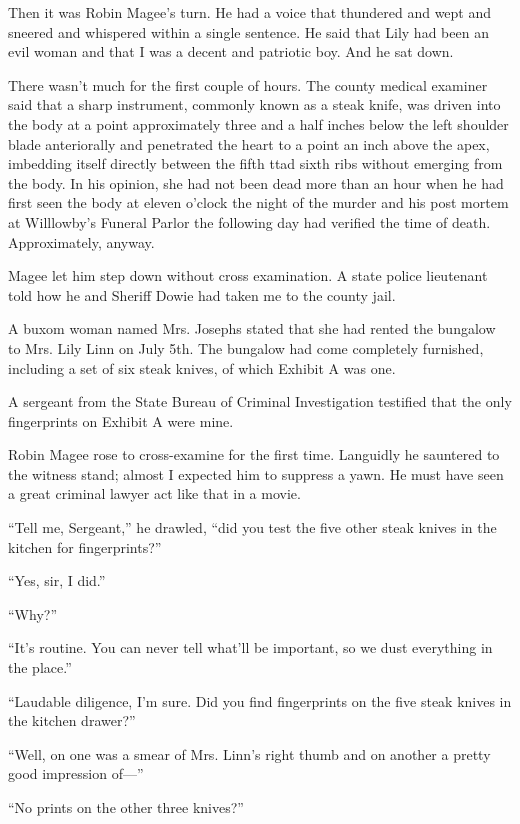 \documentclass{novel}
\begin{document}
Then it was Robin Magee’s turn. He had a voice that thundered and wept and sneered and whispered within a single sentence. He said that Lily had been an evil woman and that I was a decent and patriotic boy. And he sat down.

There wasn’t much for the first couple of hours. The county medical examiner said that a sharp instrument, commonly known as a steak knife, was driven into the body at a point approximately three and a half inches below the left shoulder blade anteriorally and penetrated the heart to a point an inch above the apex, imbedding itself directly between the fifth ttad sixth ribs without emerging from the body. In his opinion, she had not been dead more than an hour when he had first seen the body at eleven o’clock the night of the murder and his post mortem at Willlowby’s Funeral Parlor the following day had verified the time of death. Approximately, anyway.

Magee let him step down without cross examination. A state police lieutenant told how he and Sheriff Dowie had taken me to the county jail.

A buxom woman named Mrs. Josephs stated that she had rented the bungalow to Mrs. Lily Linn on July 5th. The bungalow had come completely furnished, including a set of six steak knives, of which Exhibit A was one.

A sergeant from the State Bureau of Criminal Investigation testified that the only fingerprints on Exhibit A were mine.

\scenestars

Robin Magee rose to cross-examine for the first time. Languidly he sauntered to the witness stand; almost I expected him to suppress a yawn. He must have seen a great criminal lawyer act like that in a movie.

“Tell me, Sergeant,” he drawled, “did you test the five other steak knives in the kitchen for fingerprints?”

“Yes, sir, I did.”

“Why?”

“It’s routine. You can never tell what’ll be important, so we dust everything in the place.”

“Laudable diligence, I’m sure. Did you find fingerprints on the five steak knives in the kitchen drawer?”

“Well, on one was a smear of Mrs. Linn’s right thumb and on another a pretty good impression of—”

“No prints on the other three knives?”
\end{document}
